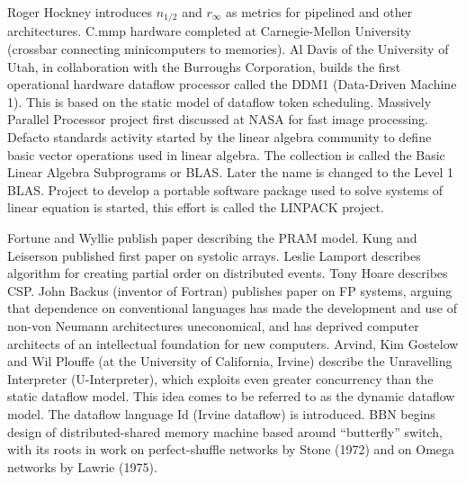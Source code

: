 	{Roger Hockney introduces $n_{1/2}$ and $r_{\infty}$
	as metrics for pipelined and other architectures.}
	{C.mmp hardware completed at Carnegie-Mellon University
	(crossbar connecting minicomputers to memories).}
	{Al Davis of the University of Utah, in collaboration with the
	Burroughs Corporation, builds the first operational hardware
	dataflow processor called the DDM1 (Data-Driven Machine 1).
	This is based on the static model of dataflow token scheduling.}
	{Massively Parallel Processor project first discussed at NASA
	for fast image processing.}
        {Defacto standards activity started by the linear algebra community
	to define basic vector operations used in linear algebra. 
	The collection is called the Basic Linear Algebra Subprograms or BLAS.
	Later the name is changed to the Level 1 BLAS.
	Project to develop a portable software package used to solve systems
	of linear equation is started, this effort is called 
	the LINPACK project.}

	{Fortune and Wyllie publish paper describing the PRAM model.}
	{Kung and Leiserson published first paper on systolic arrays.}
	{Leslie Lamport describes algorithm for creating
	partial order on distributed events.}
	{Tony Hoare describes CSP.}
	{John Backus (inventor of Fortran) publishes paper on FP systems,
	arguing that dependence on conventional languages
	has made the development and use of
	non-von Neumann architectures uneconomical,
	and has deprived computer architects of
	an intellectual foundation for new computers.}
	{Arvind, Kim Gostelow and Wil Plouffe
	(at the University of California, Irvine)
	describe the Unravelling Interpreter (U-Interpreter),
	which exploits even greater concurrency than
	the static dataflow model.
	This idea comes to be referred to as the dynamic dataflow model.
	The dataflow language Id (Irvine dataflow) is introduced.}
	{BBN begins design of distributed-shared memory machine
	based around ``butterfly'' switch,
	with its roots in work on perfect-shuffle networks by Stone (1972)
	and on Omega networks by Lawrie (1975).}

